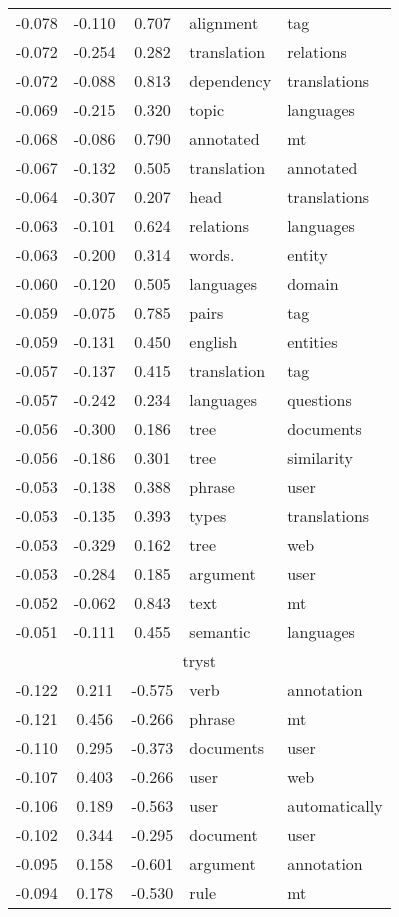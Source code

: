 \begin{tabular}{cccp{5cm}p{5cm}}
-0.078 & -0.110 & 0.707 & alignment & tag \\
-0.072 & -0.254 & 0.282 & translation & relations \\
-0.072 & -0.088 & 0.813 & dependency & translations \\
-0.069 & -0.215 & 0.320 & topic & languages \\
-0.068 & -0.086 & 0.790 & annotated & mt \\
-0.067 & -0.132 & 0.505 & translation & annotated \\
-0.064 & -0.307 & 0.207 & head & translations \\
-0.063 & -0.101 & 0.624 & relations & languages \\
-0.063 & -0.200 & 0.314 & words. & entity \\
-0.060 & -0.120 & 0.505 & languages & domain \\
-0.059 & -0.075 & 0.785 & pairs & tag \\
-0.059 & -0.131 & 0.450 & english & entities \\
-0.057 & -0.137 & 0.415 & translation & tag \\
-0.057 & -0.242 & 0.234 & languages & questions \\
-0.056 & -0.300 & 0.186 & tree & documents \\
-0.056 & -0.186 & 0.301 & tree & similarity \\
-0.053 & -0.138 & 0.388 & phrase & user \\
-0.053 & -0.135 & 0.393 & types & translations \\
-0.053 & -0.329 & 0.162 & tree & web \\
-0.053 & -0.284 & 0.185 & argument & user \\
-0.052 & -0.062 & 0.843 & text & mt \\
-0.051 & -0.111 & 0.455 & semantic & languages \\
\midrule
\multicolumn{5}{c}{tryst}\\
-0.122 & 0.211 & -0.575 & verb & annotation \\
-0.121 & 0.456 & -0.266 & phrase & mt \\
-0.110 & 0.295 & -0.373 & documents & user \\
-0.107 & 0.403 & -0.266 & user & web \\
-0.106 & 0.189 & -0.563 & user & automatically \\
-0.102 & 0.344 & -0.295 & document & user \\
-0.095 & 0.158 & -0.601 & argument & annotation \\
-0.094 & 0.178 & -0.530 & rule & mt \\

\end{tabular}
